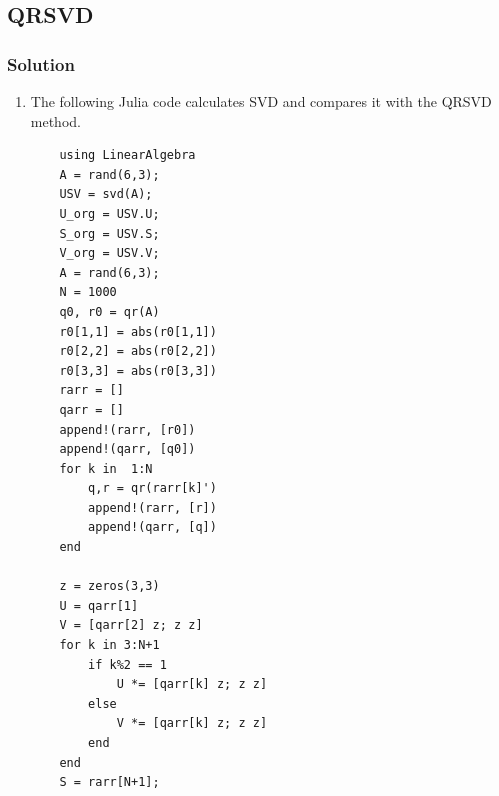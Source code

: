 \documentclass{article}
\begin{document}
\subsection*{QRSVD}
\subsubsection*{Solution}
\begin{enumerate}[label=\alph*]
    \item The following Julia code calculates SVD and compares it with the QRSVD method.
    \begin{verbatim}
    using LinearAlgebra
    A = rand(6,3);
    USV = svd(A);
    U_org = USV.U;
    S_org = USV.S;
    V_org = USV.V;
    A = rand(6,3);
    N = 1000
    q0, r0 = qr(A)
    r0[1,1] = abs(r0[1,1])
    r0[2,2] = abs(r0[2,2])
    r0[3,3] = abs(r0[3,3])
    rarr = []
    qarr = []
    append!(rarr, [r0])
    append!(qarr, [q0])
    for k in  1:N
        q,r = qr(rarr[k]')
        append!(rarr, [r])
        append!(qarr, [q])
    end
    
    z = zeros(3,3)
    U = qarr[1]
    V = [qarr[2] z; z z]
    for k in 3:N+1
        if k%2 == 1
            U *= [qarr[k] z; z z]
        else
            V *= [qarr[k] z; z z]
        end
    end
    S = rarr[N+1];
    

\end{verbatim}
\end{enumerate}
\end{document}
